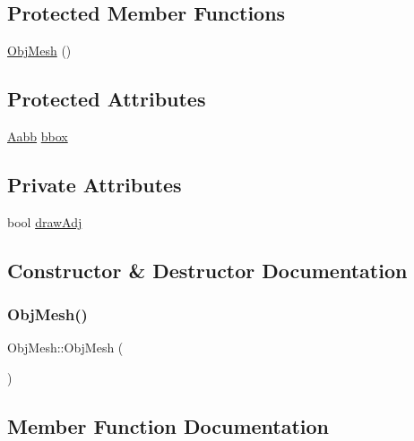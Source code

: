 \subsection*{Protected Member Functions}
\begin{DoxyCompactItemize}
\item 
\mbox{\hyperlink{class_obj_mesh_a472971647253a42f8bd585b58da6d086}{Obj\+Mesh}} ()
\end{DoxyCompactItemize}
\subsection*{Protected Attributes}
\begin{DoxyCompactItemize}
\item 
\mbox{\hyperlink{class_aabb}{Aabb}} \mbox{\hyperlink{class_obj_mesh_a21ce3155628d670cec7b107959a6788b}{bbox}}
\end{DoxyCompactItemize}
\subsection*{Private Attributes}
\begin{DoxyCompactItemize}
\item 
bool \mbox{\hyperlink{class_obj_mesh_a1999f87fdd38bb55dd70794bf1352e1a}{draw\+Adj}}
\end{DoxyCompactItemize}


\subsection{Constructor \& Destructor Documentation}
\mbox{\label{class_obj_mesh_a472971647253a42f8bd585b58da6d086}} 
\subsubsection{\texorpdfstring{ObjMesh()}{ObjMesh()}}
{\footnotesize\ttfamily Obj\+Mesh\+::\+Obj\+Mesh (\begin{DoxyParamCaption}{ }\end{DoxyParamCaption})\hspace{0.3cm}{\ttfamily [protected]}}



\subsection{Member Function Documentation}
\mbox{\label{class_obj_mesh_a783fd2e6bd401c6ec340946b0ca0ecb2}} 
